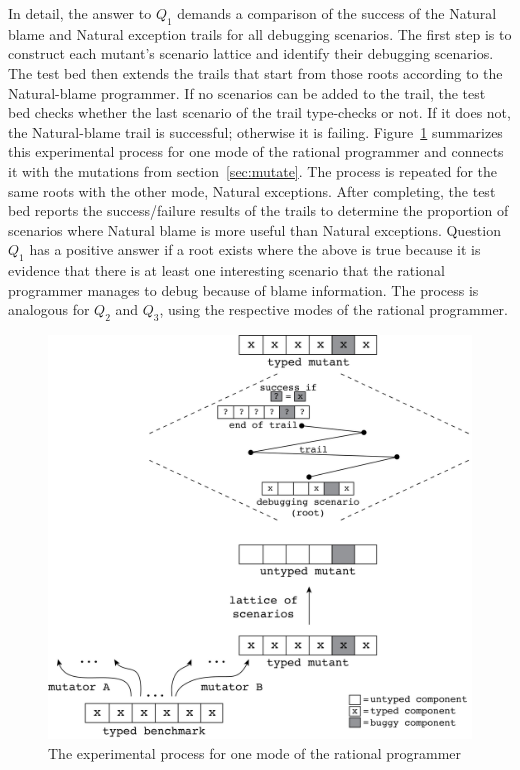 
In detail, the answer to $Q_1$ demands a comparison of the success of the Natural
blame and Natural exception trails for all debugging scenarios.  The
first step is to construct each mutant's scenario lattice and identify their
debugging scenarios.  The test bed then extends the trails that start
from those roots according to the Natural-blame programmer.  If no scenarios can
be added to the trail, the test bed checks whether the last scenario
of the trail type-checks or not. If it does not, the
Natural-blame trail is successful; otherwise it is failing. 
Figure~\ref{fig:process} summarizes this experimental process for
one mode of the rational programmer and connects it with the mutations from
section~\ref{sec:mutate}.
The process is repeated for the same roots with the other mode, Natural
exceptions.
After completing, the test bed
reports the success/failure results of the trails to determine the proportion of
scenarios where Natural blame is more useful than Natural exceptions.  Question
$Q_1$ has a positive answer if a root exists where the above is true because it
is evidence that there is at least one interesting scenario that the rational
programmer manages to debug because of blame information.  The process is analogous
for $Q_2$ and $Q_3$, using the respective modes of the rational programmer.

\begin{figure}[bh] \footnotesize
  \centering
  \includegraphics[scale=0.36]{./Images/process}
  \caption{The experimental process for one mode of the rational programmer}
  \label{fig:process}
\end{figure}


